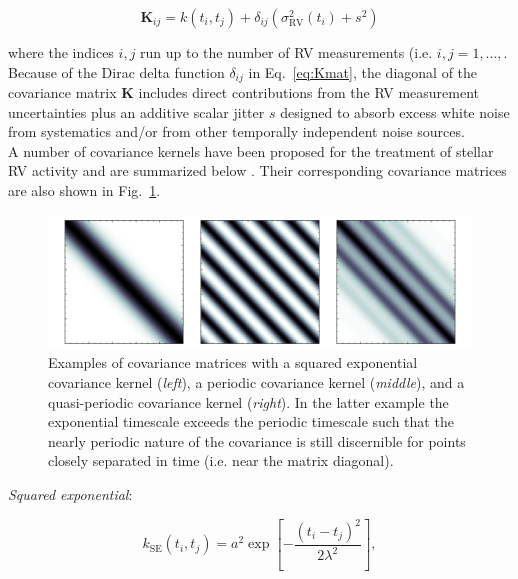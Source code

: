 \begin{equation}
  \mathbf{K}_{ij} = k(t_i,t_j) + \delta_{ij} (\sigma_{\text{RV}}^2(t_i) + s^2)
\label{eq:Kmat}
\end{equation}

\noindent where the indices $i,j$ run up to the number of RV measurements (i.e. $i,j=1,\dots,$\nrv{)}.
Because of the Dirac delta function $\delta_{ij}$ in Eq.~\ref{eq:Kmat}, the 
diagonal of the covariance matrix $\mathbf{K}$ includes direct contributions from the
RV measurement uncertainties \sigRV{} plus an additive scalar jitter $s$ designed to absorb excess
white noise from systematics and/or from other temporally independent noise sources. \\

A number of covariance kernels have been proposed for the treatment of stellar RV activity
and are summarized below \citep{grunblatt15}. Their corresponding covariance
matrices are also shown in Fig.~\ref{fig:matrices}. \\

\begin{figure}
  \centering
  \includegraphics[width=\hsize]{figures/gpmatrices.png}
  \caption[Example of covariance matrices.]
          {Examples of covariance matrices with a squared exponential covariance kernel (\emph{left}),
            a periodic covariance kernel (\emph{middle}), and a quasi-periodic covariance kernel (\emph{right}).
            In the latter example the exponential timescale exceeds the periodic timescale such that the
            nearly periodic nature of the covariance is still discernible for points closely separated
          in time (i.e. near the matrix diagonal).}
          \label{fig:matrices}
\end{figure}

\emph{Squared exponential}: 

\begin{equation}
  k_{\text{SE}}(t_i,t_j) = a^2 \exp{\left[ -\frac{(t_i-t_j)^2}{2\lambda^2} \right]},
\end{equation}

